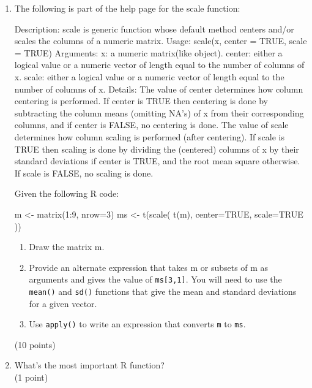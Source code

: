 \documentclass[11pt]{article}
\begin{document}
\begin{enumerate}

\item The following is part of the help page for the scale function:\\
  \begin{consolecode}
Description:
     scale is generic function whose default method centers and/or
     scales the columns of a numeric matrix.
Usage:    scale(x, center = TRUE, scale = TRUE)
Arguments:
       x: a numeric matrix(like object).
  center: either a logical value or a numeric vector of length equal 
          to the number of columns of x.
   scale: either a logical value or a numeric vector of length equal
          to the number of columns of x.
Details:
     The value of center determines how column centering is
     performed. If center is TRUE then centering is done by 
     subtracting the column means (omitting NA's) of x from 
     their corresponding columns, and if center is FALSE, 
     no centering is done.
     The value of scale determines how column scaling is performed
     (after centering).  If scale is TRUE then scaling is done by 
     dividing the (centered) columns of x by their standard 
     deviations if center is TRUE, and the root mean square otherwise.  
     If scale is FALSE, no scaling is done.

  \end{consolecode}
  
  Given the following R code:\\
  \begin{rcode}
    m <- matrix(1:9, nrow=3)
    ms <- t(scale( t(m), center=TRUE, scale=TRUE ))
  \end{rcode}
  \begin{enumerate}
  \item Draw the matrix m.
  \item Provide an alternate expression that takes m or subsets of m as
    arguments and gives the value of \texttt{ms[3,1]}. You will need to use
    the \texttt{mean()} and \texttt{sd()} functions that give the mean and
    standard deviations for a given vector.
  \item Use \texttt{apply()} to write an expression that converts \texttt{m}
    to \texttt{ms}.
  \end{enumerate}
  (10 points)

\item What's the most important R function?\\
  (1 point)
\end{enumerate}
\end{document}
